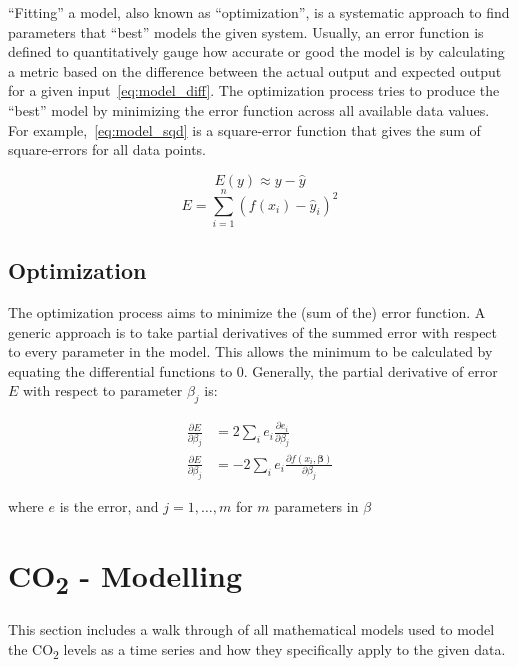 \documentclass{mcmthesis}
\begin{document}
    ``Fitting'' a model, also known as ``optimization'', is a systematic approach to find parameters that ``best'' models the given system. Usually, an error function is defined to quantitatively gauge how accurate or good the model is by calculating a metric based on the difference between the actual output and expected output for a given input~\eqref{eq:model_diff}. The optimization process tries to produce the ``best'' model by minimizing the error function across all available data values. For example,~\eqref{eq:model_sqd} is a square-error function that gives the sum of square-errors for all data points.

    \begin{equation}
        E(y) \approx y - \hat y
        \label{eq:model_diff}
    \end{equation}
    \begin{equation}
        E = \sum_{i=1}^{n} (f(x_i) - \hat y_i)^2
        \label{eq:model_sqd}
    \end{equation}


    \subsection{Optimization}

    The optimization process aims to minimize the (sum of the) error function.
    A generic approach is to take partial derivatives of the summed error with respect to every parameter in the model. This allows the minimum to be calculated by equating the differential functions to 0.
    Generally, the partial derivative of error $E$ with respect to parameter $\beta_j$ is:

    \begin{equation}
        \begin{aligned}
            \frac{\partial E}{\partial \beta_j} &= 2 \sum_i e_i \frac{\partial e_i}{\partial \beta_j} \\
            \frac{\partial E}{\partial \beta_j} &= -2\sum_i e_i\frac{\partial f(x_i,\boldsymbol \beta)}{\partial \beta_j}
        \end{aligned}
    \end{equation}

    \noindent where $e$ is the error, and $j = 1, \ldots, m$ for $m$ parameters in $\beta$

%


    \section{CO\textsubscript{2} - Modelling}
    This section includes a walk through of all mathematical models used to model the CO\textsubscript{2} levels as a time series and how they specifically apply to the given data.
\end{document}
